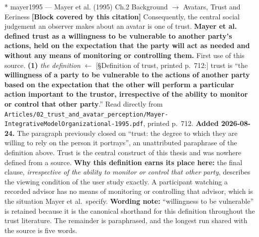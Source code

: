 \documentclass[11pt, a4paper]{article}
\makeatletter
\newcounter{citentry}
\newcommand{\citentry@core}[7]{%
  \stepcounter{citentry}
  \begingroup
  \sbox{\citentry@measurebox}{%
    \begin{minipage}{\linewidth}
      \noindent\colorbox{konstanzblue}{\parbox{\dimexpr\linewidth-2\fboxsep}{%
        \vspace{3pt}
        \textbf{\#\thecitentry \quad #2} \hfill \textit{#3}
        \vspace{3pt}
      }}
      \vspace{3pt}
      \noindent\begin{tabular}{@{}p{2.7cm} p{\dimexpr\linewidth-3cm}@{}}
        \textit{\small Sentence in thesis:} & #4 \\[5pt]
        \textbf{Usage:}\hfill       & #5 \\[5pt]
        \textit{\small Original source:}     & #6 \\[5pt]
        \textbf{How to check:}             & #7 \\
      \end{tabular}
      \vspace{5pt}
      \rule{10pt}{10pt}\quad \textbf{Validated} --- I have read the original and agree it supports the sentence.
    \end{minipage}%
  }%
  \Needspace{\dimexpr\ht\citentry@measurebox+\dp\citentry@measurebox\relax}%
  \endgroup
  \vspace{10pt}
  \noindent\colorbox{konstanzblue}{\parbox{\dimexpr\linewidth-2\fboxsep}{%
    \vspace{3pt}
    \textcolor{white}{\textbf{\#\thecitentry \quad #2}} \hfill \textcolor{white}{\textit{#3}}
    \vspace{3pt}
  }}
  \vspace{3pt}
  \noindent\begin{tabular}{@{}p{2.7cm} p{\dimexpr\linewidth-3cm}@{}}
    \textit{\small Sentence in thesis:} & \textcolor{darkgreen}{#4} \\[5pt]
    \textbf{Usage:}\hfill       & #5 \\[5pt]
    \textit{\small Original source:}     & \textcolor{darkred}{#6} \\[5pt]
    \textbf{How to check:}             & #7 \\
  \end{tabular}
  \vspace{5pt}
  \noindent\CheckBox[name=verified\thecitentry, width=10pt, height=10pt, bordercolor={0 0 0}, borderwidth=0.75, backgroundcolor={1 1 1}#1]{}\quad \textbf{Validated} --- I have read the original and agree it supports the sentence.
  \vspace{3pt}
  \noindent\textcolor{midgray}{\rule{\linewidth}{0.4pt}}
}
\newcommand{\citentry}{\@ifstar{\citentry@core{, checked}}{\citentry@core{}}}
\makeatother
\begin{document}
\begin{Form}
\citentry*
  {mayer1995 --- Mayer et al. (1995)}
  {Ch.2 Background $\rightarrow$ Avatars, Trust and Eeriness}
  {\textbf{[Block covered by this citation]} Consequently, the central social judgement an observer makes about an avatar is one of trust. \textbf{Mayer et al. defined trust as a willingness to be vulnerable to another party's actions, held on the expectation that the party will act as needed and without any means of monitoring or controlling them.}}
  {First use of this source.}
  {\textbf{(1)} \emph{the definition} $\leftarrow$ [\S Definition of trust, printed p.~712:] trust is ``the \textbf{willingness of a party to be vulnerable to the actions of another party based on the expectation that the other will perform a particular action important to the trustor, irrespective of the ability to monitor or control that other party}.''}
  {Read directly from \texttt{\footnotesize Articles/02\_trust\_and\_avatar\_perception/Mayer-IntegrativeModelOrganizational-1995.pdf}, printed p.~712. \textbf{Added 2026-08-24.} The paragraph previously closed on ``trust: the degree to which they are willing to rely on the person it portrays'', an unattributed paraphrase of the definition above. Trust is the central construct of this thesis and was nowhere defined from a source. \textbf{Why this definition earns its place here:} the final clause, \emph{irrespective of the ability to monitor or control that other party}, describes the viewing condition of the user study exactly. A participant watching a recorded advisor has no means of monitoring or controlling that advisor, which is the situation Mayer et al.\ specify. \textbf{Wording note:} ``willingness to be vulnerable'' is retained because it is the canonical shorthand for this definition throughout the trust literature. The remainder is paraphrased, and the longest run shared with the source is five words.}


\end{Form}
\end{document}
